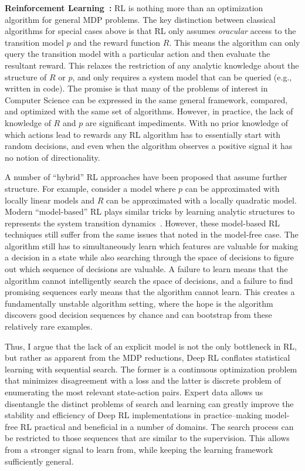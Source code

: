 \vspace{0.5em}\noindent \textbf{Reinforcement Learning~\cite{sutton1998reinforcement}: } RL is nothing more than an optimization algorithm for general MDP problems. The key distinction between classical algorithms for special cases above is that RL only assumes \emph{oracular} access to the transition model $p$ and the reward function $R$. This means the algorithm can only query the transition model with a particular action and then evaluate the resultant reward. This relaxes the restriction of any analytic knowledge about the structure of $R$ or $p$, and only requires a system model that can be queried (e.g., written in code). The promise is that many of the problems of interest in Computer Science can be expressed in the same general framework, compared, and optimized with the same set of algorithms. 
However, in practice, the lack of knowledge of $R$ and $p$ are significant impediments. With no prior knowledge of which actions lead to rewards any RL algorithm has to essentially start with random decisions, and even when the algorithm observes a positive signal it has no notion of directionality. 

A number of ``hybrid'' RL approaches have been proposed that assume further structure. For example, \cite{levine2016end} consider a model where $p$ can be approximated with locally linear models and $R$ can be approximated with a locally quadratic model. Modern ``model-based'' RL plays similar tricks by learning analytic structures to represents the system transition dynamics~\cite{mrl}. However, these model-based RL techniques still suffer from the same issues that noted in the model-free case. The algorithm still has to simultaneously learn which features are valuable for making a decision in a state while also searching through the space of decisions to figure out which sequence of decisions are valuable. A failure to learn means that the algorithm cannot intelligently search the space of decisions, and a failure to find promising sequences early means that the algorithm cannot learn.
This creates a fundamentally unstable algorithm setting, where the hope is the algorithm discovers good decision sequences by chance and can bootstrap from these relatively rare examples. 

Thus, I argue that the lack of an explicit model is not the only bottleneck in RL, but rather as apparent from the MDP reductions, Deep RL conflates statistical learning with sequential search. The former is a continuous optimization problem that minimizes disagreement with a loss and the latter is discrete problem of enumerating the most relevant state-action pairs. Expert data allows us disentangle the distinct problems of search and learning can greatly improve the stability and efficiency of Deep RL implementations in practice--making model-free RL practical and beneficial in a number of domains. The search process can be restricted to those sequences that are similar to the supervision. This allows from a stronger signal to learn from, while keeping the learning framework sufficiently general.

